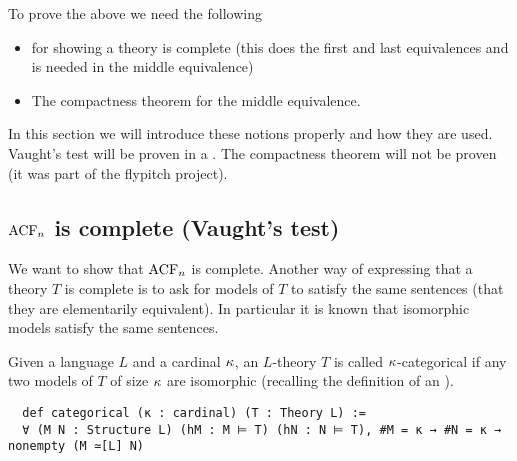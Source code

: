 To prove the above we need the following
\begin{itemize}
  \item {} for showing a theory is complete
        (this does the first and last equivalences and
        is needed in the middle equivalence)
  \item The compactness theorem for the middle equivalence.
\end{itemize}
In this section we will introduce these notions properly and how
they are used.
Vaught's test will be proven in a .
The compactness theorem will not be proven
(it was part of the flypitch project).

\subsection{$\operatorname{ACF}_{n}$ is complete (Vaught's test)}
We want to show that $\operatorname{ACF}_{n}$ is complete.
Another way of expressing that a theory $T$ is complete is to
ask for models of $T$ to satisfy the same sentences
(that they are elementarily equivalent).
In particular it is known that isomorphic models %
satisfy the same sentences.

\begin{dfn}[Categoricity]
    Given a language $L$ and a cardinal $\kappa$,
    an $L$-theory $T$ is called $\kappa$-categorical
    if any two models of $T$ of size $\kappa$ are isomorphic
    (recalling the definition of an
    ).

    \begin{lstlisting}
  def categorical (κ : cardinal) (T : Theory L) :=
  ∀ (M N : Structure L) (hM : M ⊨ T) (hN : N ⊨ T), #M = κ → #N = κ → nonempty (M ≃[L] N) \end{lstlisting}
\end{dfn}

